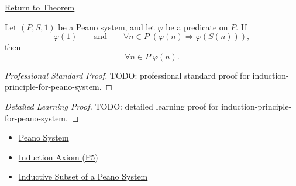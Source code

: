 \newpage
{}
\label{prf:induction-principle-for-peano-system}

\begin{remark*}[Return]
\hyperref[thm:induction-principle-for-peano-system]{Return to Theorem}
\end{remark*}

\begin{theorem*}
Let $(P,S,1)$ be a Peano system, and let $\varphi$ be a predicate on $P$.
If
\[
\varphi(1)
\qquad\text{and}\qquad
\forall n \in P\;(\varphi(n) \Longrightarrow \varphi(S(n))),
\]
then
\[
\forall n \in P\;\varphi(n).
\]
\end{theorem*}

\begin{proof}[Professional Standard Proof]
\LRAProofBodyStart
TODO: professional standard proof for induction-principle-for-peano-system.
\end{proof}

\begin{proof}[Detailed Learning Proof]
\LRAProofBodyStart
TODO: detailed learning proof for induction-principle-for-peano-system.
\end{proof}

\begin{remark*}
\end{remark*}

\begin{dependencies}
\begin{itemize}
  \item \hyperref[def:peano-system]{Peano System}
  \item \hyperref[ax:peano-induction]{Induction Axiom (P5)}
  \item \hyperref[def:inductive-subset-of-peano-system]{Inductive Subset of a Peano System}
\end{itemize}
\end{dependencies}


\clearpage

